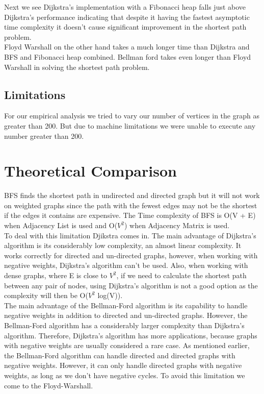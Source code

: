 \documentclass[a4paper, 12pt]{report}
\begin{document}
    Next we see Dijkstra’s implementation with a Fibonacci heap falls just above Dijkstra’s performance indicating that despite it having the fastest asymptotic  time complexity it doesn’t cause significant improvement in the shortest path problem. \\
    
    Floyd Warshall on the other hand takes a much longer time than Dijkstra and BFS and Fibonacci heap combined. Bellman ford takes even longer than Floyd Warshall in solving the shortest path problem.\\
    \pagebreak
    
    \section{Limitations}
    
    For our empirical analysis we tried to vary our number of vertices in the graph as greater than 200. But due to machine limitations we were unable to execute any number greater than 200.\\
    \pagebreak
    
    
    \chapter{Theoretical Comparison}
    
BFS finds the shortest path in undirected and directed graph but it will not work on
weighted graphs since the path with the fewest edges may not be the shortest if the 
edges it contains are expensive. The Time complexity of BFS is O(V + E) when Adjacency 
List is used and O($V^2$) when Adjacency Matrix is used.
\\
    
To deal with this limitation Djikstra comes in. The main advantage of Dijkstra’s algorithm is its considerably low complexity, an almost linear complexity. It works correctly for directed and un-directed graphs, however, when working with negative weights, Dijkstra’s algorithm can’t be used. Also, when working with dense graphs, where E is close to $V^2$, if we need to calculate the shortest path between any pair of nodes, using Dijkstra’s algorithm is not a good option as the complexity will then be O($V^2$ log(V)).
\\

The main advantage of the Bellman-Ford algorithm is its capability to handle negative weights in addition to directed and un-directed graphs. However, the Bellman-Ford algorithm has a considerably larger complexity than Dijkstra’s algorithm. Therefore,
Dijkstra’s algorithm has more applications, because graphs with negative weights are usually considered a rare case. As mentioned earlier, the Bellman-Ford algorithm can handle directed and directed graphs with negative weights. However, it can only handle directed graphs with negative weights, as long as we don’t have negative cycles. To avoid this limitation we come to the Floyd-Warshall.\\
\end{document}
